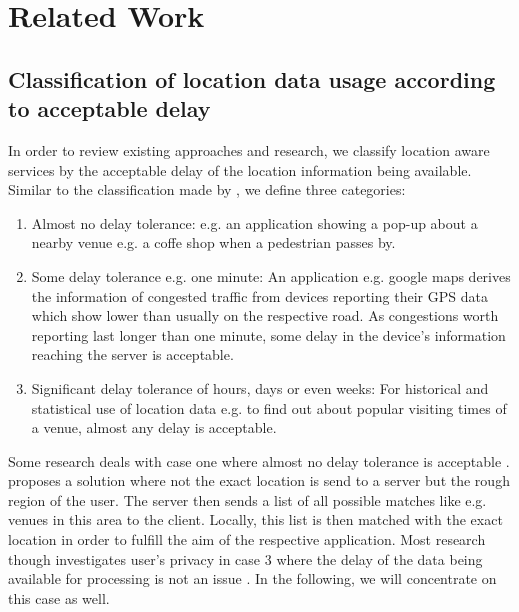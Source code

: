 \chapter{Related Work}\label{chapter:related-work}

\section{Classification of location data usage according to acceptable delay}
In order to review existing approaches and research, we classify location aware services by the acceptable delay of the location information being available. Similar to the classification made by \parencite{hoh2005protecting}, we define three categories:
\begin{enumerate}
  \item Almost no delay tolerance: e.g. an application showing a pop-up about a nearby venue e.g. a coffe shop when a pedestrian passes by.
  \item Some delay tolerance e.g. one minute: An application e.g. google maps derives the information of congested traffic from devices reporting their GPS data which show lower than usually on the respective road. As congestions worth reporting last longer than one minute, some delay in the device's information reaching the server is acceptable.
  \item Significant delay tolerance of hours, days or even weeks: For historical and statistical use of location data e.g. to find out about popular visiting times of a venue, almost any delay is acceptable.
\end{enumerate}
Some research deals with case one where almost no delay tolerance is acceptable \parencite{location-privacy, mix-zones}. \parencite{casper} proposes a solution where not the exact location is send to a server but the rough region of the user. The server then sends a list of all possible matches like e.g. venues in this area to the client. Locally, this list is then matched with the exact location in order to fulfill the aim of the respective application.
Most research though investigates user's privacy in case 3 where the delay of the data being available for processing is not an issue \parencite{krumm, cellphone, privacy-home-work-pairs, twitter}. In the following, we will concentrate on this case as well.


